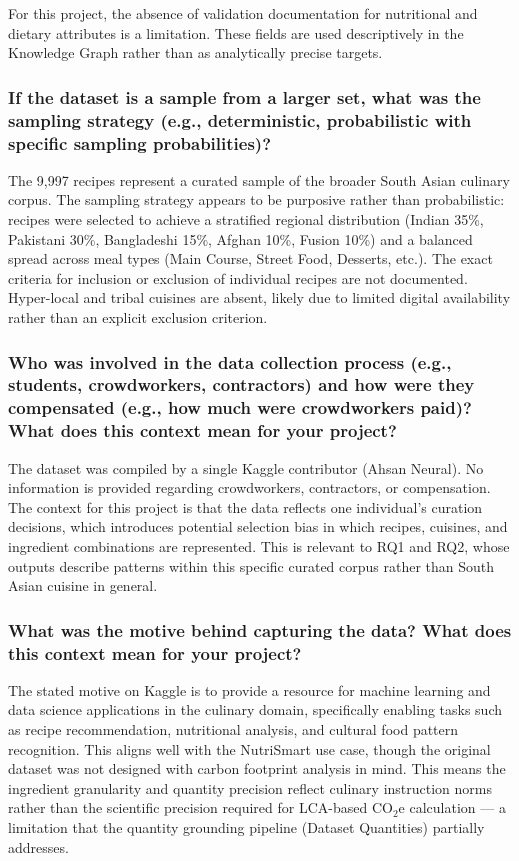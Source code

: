 \documentclass{article}
\newcommand{\question}[1]{#1}
\begin{document}
For this project, the absence of validation documentation for nutritional and dietary attributes is a limitation. These fields are used descriptively in the Knowledge Graph rather than as analytically precise targets.

\question{\subsubsection*{If the dataset is a sample from a larger set, what was the sampling strategy (e.g., deterministic, probabilistic with specific sampling probabilities)?}}

The 9,997 recipes represent a curated sample of the broader South Asian culinary corpus. The sampling strategy appears to be purposive rather than probabilistic: recipes were selected to achieve a stratified regional distribution (Indian 35\%, Pakistani 30\%, Bangladeshi 15\%, Afghan 10\%, Fusion 10\%) and a balanced spread across meal types (Main Course, Street Food, Desserts, etc.). The exact criteria for inclusion or exclusion of individual recipes are not documented. Hyper-local and tribal cuisines are absent, likely due to limited digital availability rather than an explicit exclusion criterion.

\question{\subsubsection*{Who was involved in the data collection process (e.g., students, crowdworkers, contractors) and how were they compensated (e.g., how much were crowdworkers paid)? What does this context mean for your project?}}

The dataset was compiled by a single Kaggle contributor (Ahsan Neural). No information is provided regarding crowdworkers, contractors, or compensation. The context for this project is that the data reflects one individual's curation decisions, which introduces potential selection bias in which recipes, cuisines, and ingredient combinations are represented. This is relevant to RQ1 and RQ2, whose outputs describe patterns within this specific curated corpus rather than South Asian cuisine in general.

\question{\subsubsection*{What was the motive behind capturing the data? What does this context mean for your project?}}

The stated motive on Kaggle is to provide a resource for machine learning and data science applications in the culinary domain, specifically enabling tasks such as recipe recommendation, nutritional analysis, and cultural food pattern recognition. This aligns well with the NutriSmart use case, though the original dataset was not designed with carbon footprint analysis in mind. This means the ingredient granularity and quantity precision reflect culinary instruction norms rather than the scientific precision required for LCA-based CO$_2$e calculation --- a limitation that the quantity grounding pipeline (Dataset Quantities) partially addresses.
\end{document}
